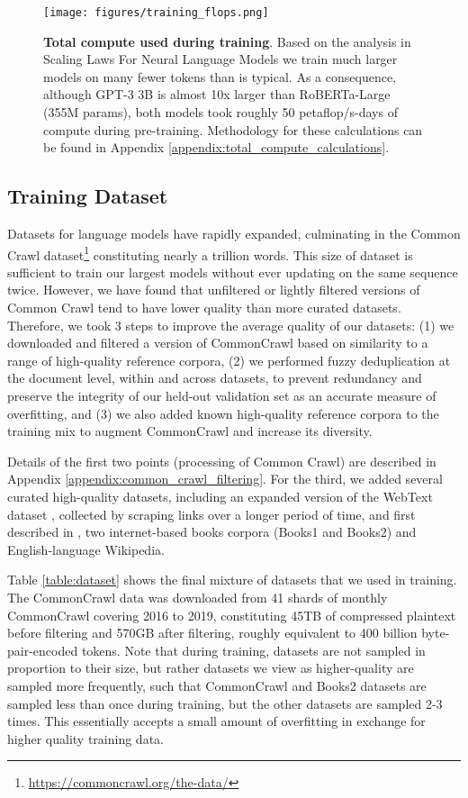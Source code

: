 \documentclass{article}
\begin{document}
\begin{figure}
\centering\texttt{[image: figures/training\_flops.png]}
\caption{\textbf{Total compute used during training}. Based on the analysis in Scaling Laws For Neural Language Models \cite{kaplan2020scaling} we train much larger models on many fewer tokens than is typical. As a consequence, although GPT-3 3B is almost 10x larger than RoBERTa-Large (355M params), both models took roughly 50 petaflop/s-days of compute during pre-training. Methodology for these calculations can be found in Appendix \ref{appendix:total_compute_calculations}.
}
\label{figure:training flops}
\end{figure}
  
    \subsection{Training Dataset}
    \label{section:Training Dataset}
    Datasets for language models have rapidly expanded, culminating in the Common Crawl dataset\footnote{\url{https://commoncrawl.org/the-data/}} \cite{raffel2019t5} constituting nearly a trillion words.  This size of dataset is sufficient to train our largest models without ever updating on the same sequence twice. However, we have found that unfiltered or lightly filtered versions of Common Crawl tend to have lower quality than more curated datasets.  Therefore, we took 3 steps to improve the average quality of our datasets: (1) we downloaded and filtered a version of CommonCrawl based on similarity to a range of high-quality reference corpora, (2) we performed fuzzy deduplication at the document level, within and across datasets, to prevent redundancy and preserve the integrity of our held-out validation set as an accurate measure of overfitting, and (3) we also added known high-quality reference corpora to the training mix to augment CommonCrawl and increase its diversity.

Details of the first two points (processing of Common Crawl) are described in Appendix \ref{appendix:common_crawl_filtering}. For the third, we added several curated high-quality datasets, including an expanded version of the WebText dataset \cite{radford2019language}, collected by scraping links over a longer period of time, and first described in \cite{kaplan2020scaling}, two internet-based books corpora (Books1 and Books2) and English-language Wikipedia.


Table \ref{table:dataset} shows the final mixture of datasets that we used in training.  The CommonCrawl data was downloaded from 41 shards of monthly CommonCrawl covering 2016 to 2019, constituting 45TB of compressed plaintext before filtering and 570GB after filtering, roughly equivalent to 400 billion byte-pair-encoded tokens.    Note that during training, datasets are not sampled in proportion to their size, but rather datasets we view as higher-quality are sampled more frequently, such that CommonCrawl and Books2 datasets are sampled less than once during training, but the other datasets are sampled 2-3 times. This essentially accepts a small amount of overfitting in exchange for higher quality training data.
\end{document}

